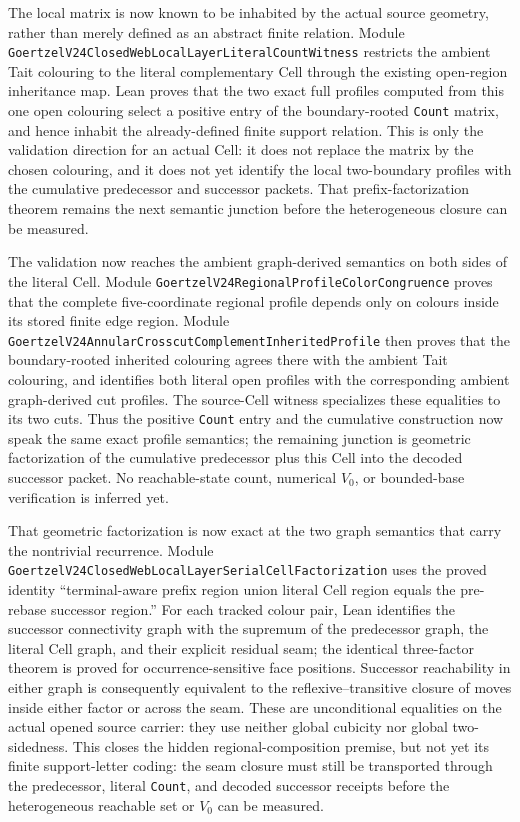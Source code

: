\documentclass[11pt]{article}
\theoremstyle{definition}
\begin{document}
The local matrix is now known to be inhabited by the actual source geometry,
rather than merely defined as an abstract finite relation.  Module
\texttt{GoertzelV24ClosedWebLocalLayerLiteralCountWitness} restricts the
ambient Tait colouring to the literal complementary Cell through the existing
open-region inheritance map.  Lean proves that the two exact full profiles
computed from this one open colouring select a positive entry of the
boundary-rooted \texttt{Count} matrix, and hence inhabit the already-defined
finite support relation.  This is only the validation direction for an actual
Cell: it does not replace the matrix by the chosen colouring, and it does not
yet identify the local two-boundary profiles with the cumulative predecessor
and successor packets.  That prefix-factorization theorem remains the next
semantic junction before the heterogeneous closure can be measured.

The validation now reaches the ambient graph-derived semantics on both sides
of the literal Cell.  Module
\texttt{GoertzelV24RegionalProfileColorCongruence} proves that the complete
five-coordinate regional profile depends only on colours inside its stored
finite edge region.  Module
\texttt{GoertzelV24AnnularCrosscutComplementInheritedProfile} then proves that
the boundary-rooted inherited colouring agrees there with the ambient Tait
colouring, and identifies both literal open profiles with the corresponding
ambient graph-derived cut profiles.  The source-Cell witness specializes
these equalities to its two cuts.  Thus the positive \texttt{Count} entry and
the cumulative construction now speak the same exact profile semantics; the
remaining junction is geometric factorization of the cumulative predecessor
plus this Cell into the decoded successor packet.  No reachable-state count,
numerical $V_0$, or bounded-base verification is inferred yet.

That geometric factorization is now exact at the two graph semantics that
carry the nontrivial recurrence.  Module
\texttt{GoertzelV24ClosedWebLocalLayerSerialCellFactorization} uses the proved
identity ``terminal-aware prefix region union literal Cell region equals the
pre-rebase successor region.''  For each tracked colour pair, Lean identifies
the successor connectivity graph with the supremum of the predecessor graph,
the literal Cell graph, and their explicit residual seam; the identical
three-factor theorem is proved for occurrence-sensitive face positions.
Successor reachability in either graph is consequently equivalent to the
reflexive--transitive closure of moves inside either factor or across the
seam.  These are unconditional equalities on the actual opened source carrier:
they use neither global cubicity nor global two-sidedness.  This closes the
hidden regional-composition premise, but not yet its finite support-letter
coding: the seam closure must still be transported through the predecessor,
literal \texttt{Count}, and decoded successor receipts before the
heterogeneous reachable set or $V_0$ can be measured.
\end{document}
